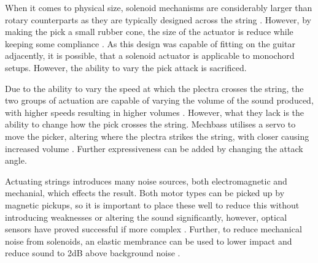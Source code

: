 \documentclass[12pt, a4paper, onecolumn]{IEEEtran}
\begin{document}
        When it comes to physical size, solenoid mechanisms are considerably larger than rotary counterparts as they are typically designed across the string \cite{VUW_Chordophones,Silent_Picking,PWM_Solenoid}.
        However, by making the pick a small rubber cone, the size of the actuator is reduce while keeping some compliance \cite{Pivot_Picking}.
        As this design was capable of fitting on the guitar adjacently, it is possible, that a solenoid actuator is applicable to monochord setups.
        However, the ability to vary the pick attack is sacrificed.

        Due to the ability to vary the speed at which the plectra crosses the string, the two groups of actuation are capable of varying the volume of the sound produced, with higher speeds resulting in higher volumes \cite{PWM_Solenoid}.
        However, what they lack is the ability to change how the pick crosses the string.
        Mechbass utilises a servo to move the picker, altering where the plectra strikes the string, with closer causing increased volume \cite{VUW_Chordophones}. 
        Further expressiveness can be added by changing the attack angle. 

        Actuating strings introduces many noise sources, both electromagnetic and mechanial, which effects the result.
        Both motor types can be picked up by magnetic pickups, so it is important to place these well to reduce this without introducing weaknesses or altering the sound significantly, however, optical sensors have proved successful if more complex \cite{VUW_Chordophones}.
        Further, to reduce mechanical noise from solenoids, an elastic membrance can be used to lower impact and reduce sound to 2dB above background noise \cite{Silent_Picking}.

        
\end{document}

